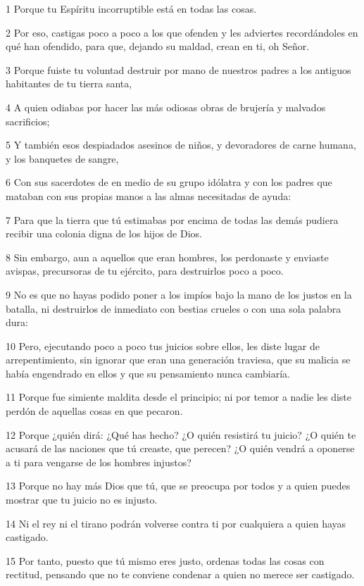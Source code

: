 \par 1 Porque tu Espíritu incorruptible está en todas las cosas.
\par 2 Por eso, castigas poco a poco a los que ofenden y les adviertes recordándoles en qué han ofendido, para que, dejando su maldad, crean en ti, oh Señor.
\par 3 Porque fuiste tu voluntad destruir por mano de nuestros padres a los antiguos habitantes de tu tierra santa,
\par 4 A quien odiabas por hacer las más odiosas obras de brujería y malvados sacrificios;
\par 5 Y también esos despiadados asesinos de niños, y devoradores de carne humana, y los banquetes de sangre,
\par 6 Con sus sacerdotes de en medio de su grupo idólatra y con los padres que mataban con sus propias manos a las almas necesitadas de ayuda:
\par 7 Para que la tierra que tú estimabas por encima de todas las demás pudiera recibir una colonia digna de los hijos de Dios.
\par 8 Sin embargo, aun a aquellos que eran hombres, los perdonaste y enviaste avispas, precursoras de tu ejército, para destruirlos poco a poco.
\par 9 No es que no hayas podido poner a los impíos bajo la mano de los justos en la batalla, ni destruirlos de inmediato con bestias crueles o con una sola palabra dura:
\par 10 Pero, ejecutando poco a poco tus juicios sobre ellos, les diste lugar de arrepentimiento, sin ignorar que eran una generación traviesa, que su malicia se había engendrado en ellos y que su pensamiento nunca cambiaría.
\par 11 Porque fue simiente maldita desde el principio; ni por temor a nadie les diste perdón de aquellas cosas en que pecaron.
\par 12 Porque ¿quién dirá: ¿Qué has hecho? ¿O quién resistirá tu juicio? ¿O quién te acusará de las naciones que tú creaste, que perecen? ¿O quién vendrá a oponerse a ti para vengarse de los hombres injustos?
\par 13 Porque no hay más Dios que tú, que se preocupa por todos y a quien puedes mostrar que tu juicio no es injusto.
\par 14 Ni el rey ni el tirano podrán volverse contra ti por cualquiera a quien hayas castigado.
\par 15 Por tanto, puesto que tú mismo eres justo, ordenas todas las cosas con rectitud, pensando que no te conviene condenar a quien no merece ser castigado.
